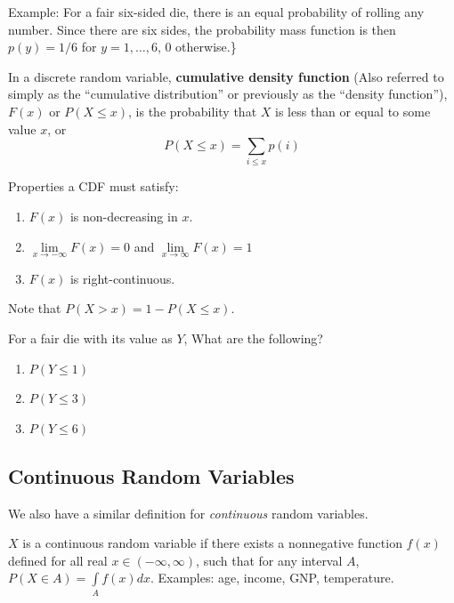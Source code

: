 \documentclass[]{book}
\providecommand{\tightlist}{%
  \setlength{\itemsep}{0pt}\setlength{\parskip}{0pt}}
\theoremstyle{definition}
\theoremstyle{definition}
\theoremstyle{definition}
\theoremstyle{remark}
\let\BeginKnitrBlock\begin \let\EndKnitrBlock\end
\begin{document}
Example: For a fair six-sided die, there is an equal probability of rolling any number. Since there are six sides, the probability mass function is then \(p(y)=1/6\) for \(y=1,\ldots,6\), 0 otherwise.\}

In a discrete random variable, \textbf{cumulative density function} (Also referred to simply as the ``cumulative distribution'' or previously as the ``density function''), \(F(x)\) or \(P(X\le x)\), is the probability that \(X\) is less than or equal to some value \(x\), or \[P(X\le x)=\sum\limits_{i\le x} p(i)\]

Properties a CDF must satisfy:

\begin{enumerate}
\def\labelenumi{\arabic{enumi}.}
\tightlist
\item
  \(F(x)\) is non-decreasing in \(x\).
\item
  \(\lim\limits_{x \to -\infty} F(x) = 0\) and \(\lim\limits_{x \to \infty} F(x) = 1\)
\item
  \(F(x)\) is right-continuous.
\end{enumerate}

Note that \(P(X > x) = 1 - P(X \le x)\).

\BeginKnitrBlock{example}
\protect\hypertarget{exm:unnamed-chunk-77}{}{\label{exm:unnamed-chunk-77} }For a fair die with its value as \(Y\), What are the following?

\begin{enumerate}
\def\labelenumi{\arabic{enumi}.}
\tightlist
\item
  \(P(Y\le 1)\)
\item
  \(P(Y\le 3)\)
\item
  \(P(Y\le 6)\)
\end{enumerate}
\EndKnitrBlock{example}

\hypertarget{continuous-random-variables}{%
\subsection*{Continuous Random Variables}\label{continuous-random-variables}}

We also have a similar definition for \emph{continuous} random variables.

\BeginKnitrBlock{definition}[Continuous Random Variable]
\protect\hypertarget{def:unnamed-chunk-78}{}{\label{def:unnamed-chunk-78} {} }
\(X\) is a continuous random variable if there exists a nonnegative function \(f(x)\) defined for all real \(x\in (-\infty,\infty)\), such that for any interval \(A\), \(P(X\in A)=\int\limits_A f(x)dx\). Examples: age, income, GNP, temperature.
\EndKnitrBlock{definition}
\end{document}

